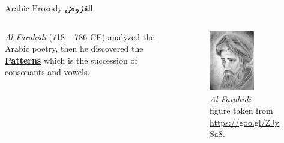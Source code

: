 \begin{frame}[fragile]{Arabic Prosody \textarabic{العَرُوض}}
\begin{columns}
\begin{column}{0.6\textwidth}
	\textit{Al-Farahidi} (718 – 786 CE) analyzed the Arabic poetry, then he discovered the \alert{\underline{\textbf{Patterns}}} which is the succession of consonants and vowels.
\end{column}
\begin{column}{0.4\textwidth}
		\begin{figure}
			\begin{center}
				\includegraphics[width=0.6\textwidth]{Figures/Al-Farahidi.jpg}
				\caption{\textit{Al-Farahidi}\\
{\tiny figure taken from \url{https://goo.gl/ZJySa8}}.}
			\end{center}
		\end{figure}
\end{column}
\end{columns}
\end{frame}

